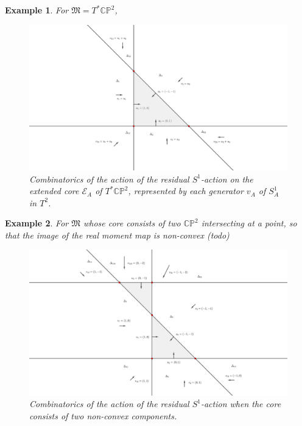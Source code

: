 \documentclass{article}
\newtheorem{example}{Example}
\newcommand{\PP}{\mathbb{P}}
\newcommand{\CC}{\mathbb{C}}
\newcommand{\mcE}{\mathcal{E}}
\newcommand{\mf}[1]{\mathfrak{#1}}
\begin{document}
	
	\begin{example}
		For $\mf{M} = T^{\ast}\CC\PP^{2}$,
		
		\begin{figure}[h!]
			\includegraphics[width=1\linewidth]{figures/T_CP2_combinatorics.pdf}
			\caption{Combinatorics of the action of the residual $S^{1}$-action on the extended core $\mcE_{A}$ of $T^{\ast}\CC\PP^{2}$, represented by each generator $v_{A}$ of $S_{A}^{1}$ in $T^{2}$.}
		\end{figure}
		

	
	\end{example}

	\begin{example}
		For $\mf{M}$ whose core consists of two $\CC\PP^{2}$ intersecting at a point, so that the image of the real moment map is non-convex (todo)
		
		\begin{figure}[h!]
			\includegraphics[width=1\linewidth]{figures/non-convex_combinatorics.pdf}
			\caption{Combinatorics of the action of the residual $S^{1}$-action when the core consists of two non-convex components.}
		\end{figure}
		
		
		
	\end{example}
	
\end{document}
